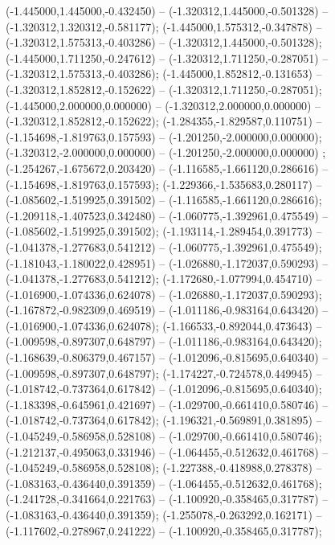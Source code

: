  (-1.445000,1.445000,-0.432450) -- (-1.320312,1.445000,-0.501328) -- (-1.320312,1.320312,-0.581177);
 (-1.445000,1.575312,-0.347878) -- (-1.320312,1.575313,-0.403286) -- (-1.320312,1.445000,-0.501328);
 (-1.445000,1.711250,-0.247612) -- (-1.320312,1.711250,-0.287051) -- (-1.320312,1.575313,-0.403286);
 (-1.445000,1.852812,-0.131653) -- (-1.320312,1.852812,-0.152622) -- (-1.320312,1.711250,-0.287051);
 (-1.445000,2.000000,0.000000) -- (-1.320312,2.000000,0.000000) -- (-1.320312,1.852812,-0.152622);
 (-1.284355,-1.829587,0.110751) -- (-1.154698,-1.819763,0.157593) -- (-1.201250,-2.000000,0.000000);
 (-1.320312,-2.000000,0.000000) -- (-1.201250,-2.000000,0.000000) ;
 (-1.254267,-1.675672,0.203420) -- (-1.116585,-1.661120,0.286616) -- (-1.154698,-1.819763,0.157593);
 (-1.229366,-1.535683,0.280117) -- (-1.085602,-1.519925,0.391502) -- (-1.116585,-1.661120,0.286616);
 (-1.209118,-1.407523,0.342480) -- (-1.060775,-1.392961,0.475549) -- (-1.085602,-1.519925,0.391502);
 (-1.193114,-1.289454,0.391773) -- (-1.041378,-1.277683,0.541212) -- (-1.060775,-1.392961,0.475549);
 (-1.181043,-1.180022,0.428951) -- (-1.026880,-1.172037,0.590293) -- (-1.041378,-1.277683,0.541212);
 (-1.172680,-1.077994,0.454710) -- (-1.016900,-1.074336,0.624078) -- (-1.026880,-1.172037,0.590293);
 (-1.167872,-0.982309,0.469519) -- (-1.011186,-0.983164,0.643420) -- (-1.016900,-1.074336,0.624078);
 (-1.166533,-0.892044,0.473643) -- (-1.009598,-0.897307,0.648797) -- (-1.011186,-0.983164,0.643420);
 (-1.168639,-0.806379,0.467157) -- (-1.012096,-0.815695,0.640340) -- (-1.009598,-0.897307,0.648797);
 (-1.174227,-0.724578,0.449945) -- (-1.018742,-0.737364,0.617842) -- (-1.012096,-0.815695,0.640340);
 (-1.183398,-0.645961,0.421697) -- (-1.029700,-0.661410,0.580746) -- (-1.018742,-0.737364,0.617842);
 (-1.196321,-0.569891,0.381895) -- (-1.045249,-0.586958,0.528108) -- (-1.029700,-0.661410,0.580746);
 (-1.212137,-0.495063,0.331946) -- (-1.064455,-0.512632,0.461768) -- (-1.045249,-0.586958,0.528108);
 (-1.227388,-0.418988,0.278378) -- (-1.083163,-0.436440,0.391359) -- (-1.064455,-0.512632,0.461768);
 (-1.241728,-0.341664,0.221763) -- (-1.100920,-0.358465,0.317787) -- (-1.083163,-0.436440,0.391359);
 (-1.255078,-0.263292,0.162171) -- (-1.117602,-0.278967,0.241222) -- (-1.100920,-0.358465,0.317787);

